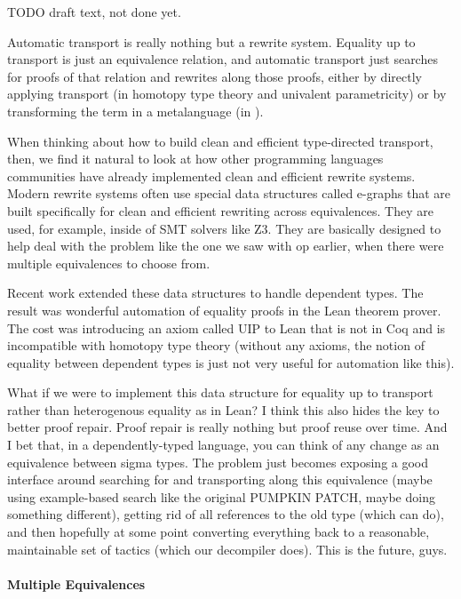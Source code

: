 TODO draft text, not done yet.

Automatic transport is really nothing but a rewrite system.
Equality up to transport is just an equivalence relation, and automatic transport just searches for proofs of that relation and rewrites along those proofs, either by directly applying transport (in homotopy type theory and univalent parametricity) or by transforming the term in a metalanguage (in \toolname).

When thinking about how to build clean and efficient type-directed transport, then, we find it natural to look
at how other programming languages communities have already implemented clean and efficient rewrite systems.
Modern rewrite systems often use special data structures called e-graphs that are built specifically
for clean and efficient rewriting across equivalences.
They are used, for example, inside of SMT solvers like Z3.
They are basically designed to help deal with the problem like the one we saw with op earlier, when there were multiple equivalences to 
choose from.

Recent work extended these data structures to handle dependent types. The result was wonderful automation of equality proofs in the Lean theorem prover. The cost was introducing an axiom called UIP to Lean that is not in Coq and is incompatible with homotopy type theory (without any axioms, the notion of equality between dependent types is just not very useful for automation like this).

What if we were to implement this data structure for equality up to transport rather than heterogenous equality as in Lean?
I think this also hides the key to better proof repair. Proof repair is really nothing but proof reuse over time. And I bet that, in a dependently-typed language, you can think of any change as an equivalence between sigma types. The problem just becomes exposing a good interface around searching for and transporting along this equivalence (maybe using example-based search like the original PUMPKIN PATCH, maybe doing something different), getting rid of all references to the old type (which \toolname can do), and then hopefully at some point converting everything back to a reasonable, maintainable set of tactics (which our decompiler does). This is the future, guys.

\paragraph{Multiple Equivalences}

